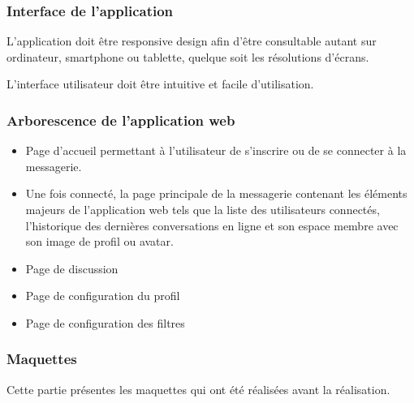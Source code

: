 \subsubsection{Interface de l’application}

\par L’application doit être responsive design afin d’être consultable autant sur ordinateur, smartphone ou tablette, quelque soit les résolutions d’écrans.

\par L’interface utilisateur doit être intuitive et facile d’utilisation.

\subsubsection{Arborescence de l’application web}

\begin{itemize}
	\item Page d'accueil permettant à l’utilisateur de s'inscrire ou de se connecter à la messagerie.
	\item Une fois connecté, la page principale de la messagerie contenant les éléments majeurs de l'application web tels que la liste des utilisateurs connectés, l’historique des dernières conversations en ligne et son espace membre avec son image de profil ou avatar.
	\item Page de discussion
	\item Page de configuration du profil
	\item Page de configuration des filtres
\end{itemize}

\subsubsection{Maquettes}

Cette partie présentes les maquettes qui ont été réalisées avant la réalisation.

